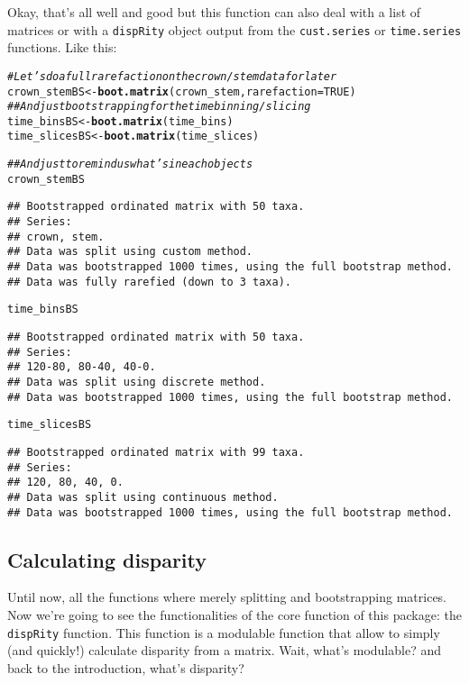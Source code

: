 \documentclass{article}\usepackage[]{graphicx}\usepackage[]{color}
\makeatletter
\newcommand{\hlnum}[1]{\textcolor[rgb]{0.686,0.059,0.569}{#1}}%
\newcommand{\hlcom}[1]{\textcolor[rgb]{0.678,0.584,0.686}{\textit{#1}}}%
\newcommand{\hlstd}[1]{\textcolor[rgb]{0.345,0.345,0.345}{#1}}%
\newcommand{\hlkwb}[1]{\textcolor[rgb]{0.69,0.353,0.396}{#1}}%
\newcommand{\hlkwc}[1]{\textcolor[rgb]{0.333,0.667,0.333}{#1}}%
\newcommand{\hlkwd}[1]{\textcolor[rgb]{0.737,0.353,0.396}{\textbf{#1}}}%
\newenvironment{kframe}{%
 \def\at@end@of@kframe{}%
 \ifinner\ifhmode%
  \def\at@end@of@kframe{\end{minipage}}%
  \begin{minipage}{\columnwidth}%
 \fi\fi%
 \def\FrameCommand##1{\hskip\@totalleftmargin \hskip-\fboxsep
 \colorbox{shadecolor}{##1}\hskip-\fboxsep
     \hskip-\linewidth \hskip-\@totalleftmargin \hskip\columnwidth}%
 \MakeFramed {\advance\hsize-\width
   \@totalleftmargin\z@ \linewidth\hsize
   \@setminipage}}%
 {\par\unskip\endMakeFramed%
 \at@end@of@kframe}
\newenvironment{knitrout}{}{} %
\newcommand{\dispRity}{\texttt{dispRity} }
\makeatother
\begin{document}
Okay, that's all well and good but this function can also deal with a list of matrices or with a \dispRity object output from the \texttt{cust.series} or \texttt{time.series} functions.
Like this:

\begin{knitrout}
\color{fgcolor}\begin{kframe}
\begin{alltt}
\hlcom{#Let's do a full rarefaction on the crown/stem data for later}
\hlstd{crown_stemBS} \hlkwb{<-} \hlkwd{boot.matrix}\hlstd{(crown_stem,} \hlkwc{rarefaction} \hlstd{=} \hlnum{TRUE}\hlstd{)}
\hlcom{## And just bootstrapping for the time binning/slicing}
\hlstd{time_binsBS} \hlkwb{<-} \hlkwd{boot.matrix}\hlstd{(time_bins)}
\hlstd{time_slicesBS} \hlkwb{<-} \hlkwd{boot.matrix}\hlstd{(time_slices)}

\hlcom{## And just to remind us what's in each objects}
\hlstd{crown_stemBS}
\end{alltt}
\begin{verbatim}
## Bootstrapped ordinated matrix with 50 taxa. 
## Series:
## crown, stem.
## Data was split using custom method.
## Data was bootstrapped 1000 times, using the full bootstrap method.
## Data was fully rarefied (down to 3 taxa).
\end{verbatim}
\begin{alltt}
\hlstd{time_binsBS}
\end{alltt}
\begin{verbatim}
## Bootstrapped ordinated matrix with 50 taxa. 
## Series:
## 120-80, 80-40, 40-0.
## Data was split using discrete method.
## Data was bootstrapped 1000 times, using the full bootstrap method.
\end{verbatim}
\begin{alltt}
\hlstd{time_slicesBS}
\end{alltt}
\begin{verbatim}
## Bootstrapped ordinated matrix with 99 taxa. 
## Series:
## 120, 80, 40, 0.
## Data was split using continuous method.
## Data was bootstrapped 1000 times, using the full bootstrap method.
\end{verbatim}
\end{kframe}
\end{knitrout}

\subsection{Calculating disparity}
Until now, all the functions where merely splitting and bootstrapping matrices.
Now we're going to see the functionalities of the core function of this package: the \dispRity function.
This function is a modulable function that allow to simply (and quickly!) calculate disparity from a matrix.
Wait, what's modulable? and back to the introduction, what's disparity?
\end{document}
